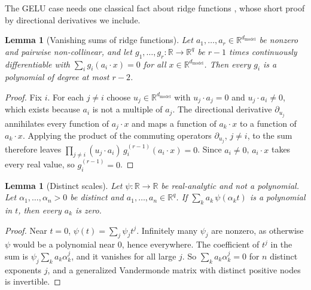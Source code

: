 \documentclass[10pt]{article}
\newtheorem{lemma}[theorem]{Lemma}
\theoremstyle{definition}
\theoremstyle{remark}
\newcommand{\R}{\mathbb{R}}
\newcommand{\dm}{d_{\mathrm{model}}}
\begin{document}
The GELU case needs one classical fact about ridge functions \citep[Propositions~3.1 and~3.3]{pinkus2013ridge}, whose short proof by directional derivatives we include.

\begin{lemma}[Vanishing sums of ridge functions]\label{lem:ridge}
Let $a_1, \dots, a_r \in \R^{\dm}$ be nonzero and pairwise non-collinear, and let $g_1, \dots, g_r : \R \to \R^q$ be $r-1$ times continuously differentiable with $\sum_{i} g_i(a_i\cdot x) = 0$ for all $x \in \R^{\dm}$. Then every $g_i$ is a polynomial of degree at most $r-2$.
\end{lemma}
\begin{proof}
Fix $i$. For each $j \neq i$ choose $u_j \in \R^{\dm}$ with $u_j\cdot a_j = 0$ and $u_j\cdot a_i \neq 0$, which exists because $a_i$ is not a multiple of $a_j$. The directional derivative $\partial_{u_j}$ annihilates every function of $a_j\cdot x$ and maps a function of $a_k\cdot x$ to a function of $a_k\cdot x$. Applying the product of the commuting operators $\partial_{u_j}$, $j \neq i$, to the sum therefore leaves $\prod_{j \neq i}(u_j\cdot a_i)\, g_i^{(r-1)}(a_i\cdot x) = 0$. Since $a_i \neq 0$, $a_i\cdot x$ takes every real value, so $g_i^{(r-1)} = 0$.
\end{proof}

\begin{lemma}[Distinct scales]\label{lem:scales}
Let $\psi : \R \to \R$ be real-analytic and not a polynomial. Let $\alpha_1, \dots, \alpha_n > 0$ be distinct and $a_1, \dots, a_n \in \R^q$. If $\sum_k a_k\,\psi(\alpha_kt)$ is a polynomial in $t$, then every $a_k$ is zero.
\end{lemma}
\begin{proof}
Near $t = 0$, $\psi(t) = \sum_j \psi_jt^j$. Infinitely many $\psi_j$ are nonzero, as otherwise $\psi$ would be a polynomial near $0$, hence everywhere. The coefficient of $t^j$ in the sum is $\psi_j\sum_k a_k\alpha_k^j$, and it vanishes for all large $j$. So $\sum_k a_k\alpha_k^j = 0$ for $n$ distinct exponents $j$, and a generalized Vandermonde matrix with distinct positive nodes is invertible.
\end{proof}
\end{document}
